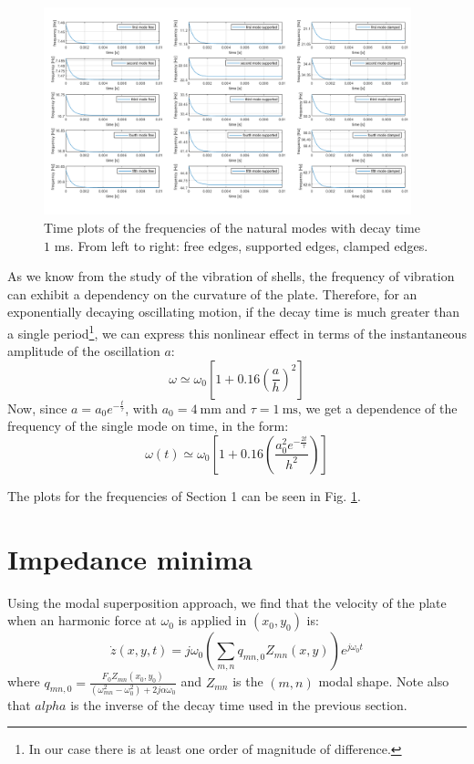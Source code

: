 \documentclass[a4paper]{article}
\begin{document}
\begin{figure}[h]
	\centering\includegraphics[width=0.95\textwidth]{point_3.png}
	\caption{Time plots of the frequencies of the natural modes with decay time $1$ ms. From left to right: free edges, supported edges, clamped edges.}
	\label{fig:dec}
\end{figure}

As we know from the study of the vibration of shells, the frequency of vibration can exhibit a dependency on the curvature of the plate. Therefore, for an exponentially decaying oscillating motion, if the decay time is much greater than a single period\footnote{In our case there is at least one order of magnitude of difference.}, we can express this nonlinear effect in terms of the instantaneous amplitude of the oscillation $a$:
$$ \omega \simeq \omega_0 \left[ 1 + 0.16 \left( \frac{a}{h} \right)^2 \right] $$
Now, since $a = a_0 e^{-\frac{t}{\tau}}$, with $a_0 = \SI{4}{\milli\meter}$ and $\tau = \SI{1}{\milli\second}$, we get a dependence of the frequency of the single mode on time, in the form:
$$ \omega(t) \simeq \omega_0 \left[ 1 + 0.16 \left( \frac{a_0^2  e^{-\frac{2t}{\tau}}}{h^2} \right) \right] $$

The plots for the frequencies of Section 1 can be seen in Fig. \ref{fig:dec}.

\section{Impedance minima}

Using the modal superposition approach, we find that the velocity of the plate when an harmonic force at $\omega_0$ is applied in $(x_0, y_0)$ is:
$$ \dot z(x, y, t) = j \omega_0\left(\sum_{m,n} q_{mn,0}  Z_{mn}(x,y)\right) e^{j\omega_0 t} $$
where $ q_{mn,0} = \frac{F_{0} Z_{mn}(x_0, y_0)}{(\omega_{mn}^2 - \omega_0^2) + 2j\alpha \omega_0} $ and $Z_{mn}$ is the $(m,n)$ modal shape. Note also that $alpha$ is the inverse of the decay time used in the previous section.
\end{document}
